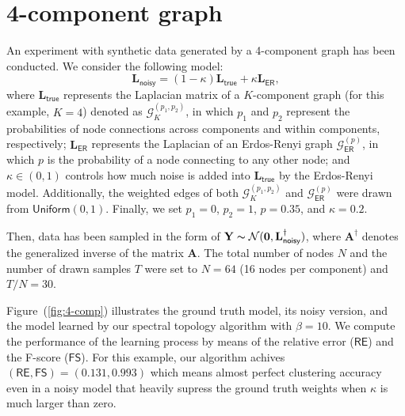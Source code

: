 \documentclass{article}
\begin{document}
\section{4-component graph}
An experiment with synthetic data generated by a 4-component graph has been conducted.
We consider the following model:
\begin{equation}
  \mathbf{L}_{\mathsf{noisy}} = (1 - \kappa) \mathbf{L}_{\mathsf{true}} + \kappa \mathbf{L}_{\mathsf{ER}},
  \label{eq:model}
\end{equation}
where $\mathbf{L}_{\mathsf{true}}$ represents the Laplacian matrix of a $K$-component graph (for this example, $K = 4$)
denoted as $\mathcal{G}^{(p_1, p_2)}_K$,
in which $p_1$ and $p_2$ represent the probabilities of node connections across components and within components, respectively;
$\mathbf{L}_{\mathsf{ER}}$ represents the Laplacian of an Erdos-Renyi graph $\mathcal{G}^{(p)}_{\mathsf{ER}}$, in which $p$
is the probability of a node connecting to any other node; and $\kappa \in (0, 1)$ controls how much noise is added into
$\mathbf{L}_{\mathsf{true}}$ by the Erdos-Renyi model. Additionally, the weighted edges of both $\mathcal{G}^{(p_1, p_2)}_K$
and $\mathcal{G}^{(p)}_{\mathsf{ER}}$ were drawn from $\textsf{Uniform}(0, 1)$. Finally, we set $p_1 = 0$, $p_2 = 1$,
$p = 0.35$, and $\kappa = 0.2$.

Then, data has been sampled in the form of $\mathbf{Y} \thicksim \mathcal{N}(\mathbf{0}, \mathbf{L}_{\mathsf{noisy}}^{\dagger})$,
where $\mathbf{A}^{\dagger}$ denotes the generalized inverse of the matrix $\mathbf{A}$. The total number of nodes $N$
and the number of drawn samples $T$ were set to $N = 64$ (16 nodes per component) and $T / N = 30$.

Figure~(\ref{fig:4-comp}) illustrates the ground truth model, its noisy version, and the model learned by our spectral
topology algorithm with $\beta = 10$. We compute the performance of the learning process by means of the relative error
($\textsf{RE}$) and the F-score ($\textsf{FS}$). For this example, our algorithm achives $(\mathsf{RE}, \mathsf{FS}) = (0.131, 0.993)$
which means almost perfect clustering accuracy even in a noisy model that heavily supress the ground truth weights when $\kappa$ is much
larger than zero.
\end{document}
